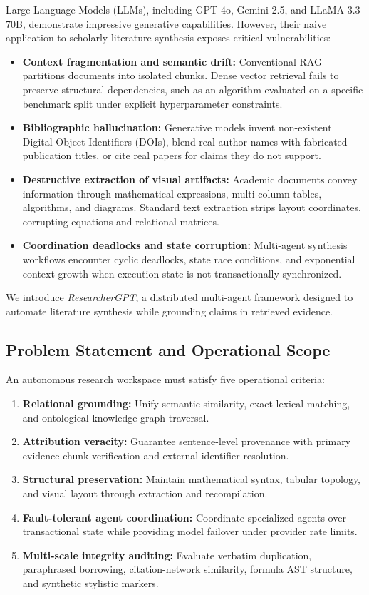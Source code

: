 \documentclass[conference]{IEEEtran}
\begin{document}
Large Language Models (LLMs), including GPT-4o, Gemini 2.5, and LLaMA-3.3-70B, demonstrate impressive generative capabilities. However, their naive application to scholarly literature synthesis exposes critical vulnerabilities:
\begin{itemize}
\item \textbf{Context fragmentation and semantic drift:} Conventional RAG partitions documents into isolated chunks. Dense vector retrieval fails to preserve structural dependencies, such as an algorithm evaluated on a specific benchmark split under explicit hyperparameter constraints.
\item \textbf{Bibliographic hallucination:} Generative models invent non-existent Digital Object Identifiers (DOIs), blend real author names with fabricated publication titles, or cite real papers for claims they do not support.
\item \textbf{Destructive extraction of visual artifacts:} Academic documents convey information through mathematical expressions, multi-column tables, algorithms, and diagrams. Standard text extraction strips layout coordinates, corrupting equations and relational matrices.
\item \textbf{Coordination deadlocks and state corruption:} Multi-agent synthesis workflows encounter cyclic deadlocks, state race conditions, and exponential context growth when execution state is not transactionally synchronized.
\end{itemize}

We introduce \textit{ResearcherGPT}, a distributed multi-agent framework designed to automate literature synthesis while grounding claims in retrieved evidence.

\subsection{Problem Statement and Operational Scope}
An autonomous research workspace must satisfy five operational criteria:
\begin{enumerate}
\item \textbf{Relational grounding:} Unify semantic similarity, exact lexical matching, and ontological knowledge graph traversal.
\item \textbf{Attribution veracity:} Guarantee sentence-level provenance with primary evidence chunk verification and external identifier resolution.
\item \textbf{Structural preservation:} Maintain mathematical syntax, tabular topology, and visual layout through extraction and recompilation.
\item \textbf{Fault-tolerant agent coordination:} Coordinate specialized agents over transactional state while providing model failover under provider rate limits.
\item \textbf{Multi-scale integrity auditing:} Evaluate verbatim duplication, paraphrased borrowing, citation-network similarity, formula AST structure, and synthetic stylistic markers.
\end{enumerate}
\end{document}
